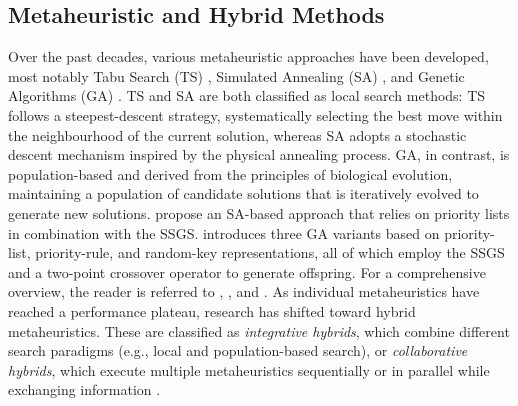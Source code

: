 \subsection*{Metaheuristic and Hybrid Methods}
Over the past decades, various metaheuristic approaches have been developed, most
notably Tabu Search (TS) \parencite{Glover1989,Glover1990}, Simulated Annealing (SA)
\parencite{Kirkpatrick1983}, and Genetic Algorithms (GA) \parencite{Holland1992}. TS
and SA are both classified as local search methods: TS follows a steepest-descent
strategy, systematically selecting the best move within the neighbourhood of the current
solution, whereas SA adopts a stochastic descent mechanism inspired by the physical
annealing process. GA, in contrast, is population-based and derived from the principles
of biological evolution, maintaining a population of candidate solutions that is
iteratively evolved to generate new solutions. \cite{Bouleimen2003} propose an
SA-based approach that relies on priority lists in combination with the SSGS.
\cite{Hartmann1998} introduces three GA variants based on priority-list, priority-rule,
and random-key representations, all of which employ the SSGS and a two-point crossover
operator to generate offspring. For a comprehensive overview, the reader is referred to
\cite{hartmann2000}, \cite{Kolisch2006a}, and \cite{Demeulemeester2002}.
As individual metaheuristics have reached a performance plateau,
research has shifted toward hybrid metaheuristics. These are classified as \textit{integrative
hybrids}, which combine different search paradigms (e.g., local and population-based
search), or \textit{collaborative hybrids}, which execute multiple metaheuristics
sequentially or in parallel while exchanging information
\parencite{Pellerin2020}.
